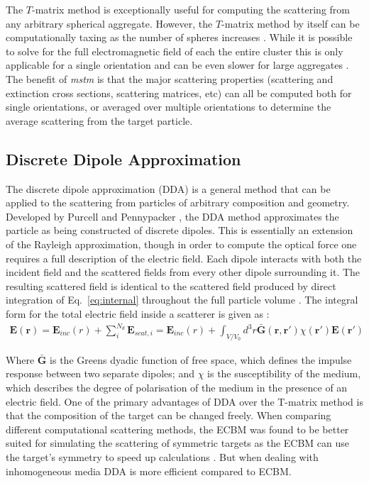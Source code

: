 The $T$-matrix method is exceptionally useful for computing the 
scattering from any arbitrary spherical aggregate. However, the 
$T$-matrix method by itself can be computationally taxing as the 
number of spheres increases \cite{Mackowski2011}. While it is 
possible to solve for the full electromagnetic field of each the 
entire cluster this is only applicable for a single orientation 
and can be even slower for large aggregates \cite{Mackowski1996, 
Xu1995}. The benefit of \textit{mstm} is that the major scattering 
properties (scattering and extinction cross sections, scattering 
matrices, etc) can all be computed both for single orientations, 
or averaged over multiple orientations to determine the average 
scattering from the target particle. 

\subsection{Discrete Dipole Approximation}
The discrete dipole approximation (DDA) is a general method that 
can be applied to the scattering from particles of arbitrary 
composition and geometry. Developed by Purcell and Pennypacker 
\cite{Purcell1973}, the DDA method approximates the particle as 
being constructed of discrete dipoles. This is essentially an 
extension of the Rayleigh approximation, though in order to compute 
the optical force one requires a full description of the electric 
field. Each dipole interacts with both the incident field and the 
scattered fields from every other dipole surrounding it. The 
resulting scattered field is identical to the scattered field 
produced by direct integration of Eq.~\eqref{eq:internal} 
throughout the full particle volume \cite{Goedecke1988}. The 
integral form for the total electric field inside a scatterer is 
given as \cite{Wriedt1998}:
\begin{align}
	\mathbf{E(r)} = \mathbf{E}_{inc}(r) + \sum^{N_d}_{i}\mathbf{E}_{scat,i} =  
	\mathbf{E}_{inc}(r) + \int_{V/V_0}d^3r\mathbf{\bar{G}(r,r')}
	\chi(\mathbf{r'})\mathbf{E(r')}
	\label{eq:DDA}
\end{align}

Where $\mathbf{\bar{G}}$ is the Greens dyadic function of free space, 
which defines the impulse response between two separate dipoles; and 
$\chi$ is the susceptibility of the medium, which describes the 
degree of polarisation of the medium in the presence of an electric 
field. One of the primary advantages of DDA over the T-matrix method 
is that the composition of the target can be changed freely. When 
comparing different computational scattering methods, the ECBM was 
found to be better suited for simulating the scattering of symmetric
targets as the ECBM can use the target's symmetry to speed up 
calculations \cite{Wriedt1998}. But when dealing with inhomogeneous 
media DDA is more efficient compared to ECBM. 


